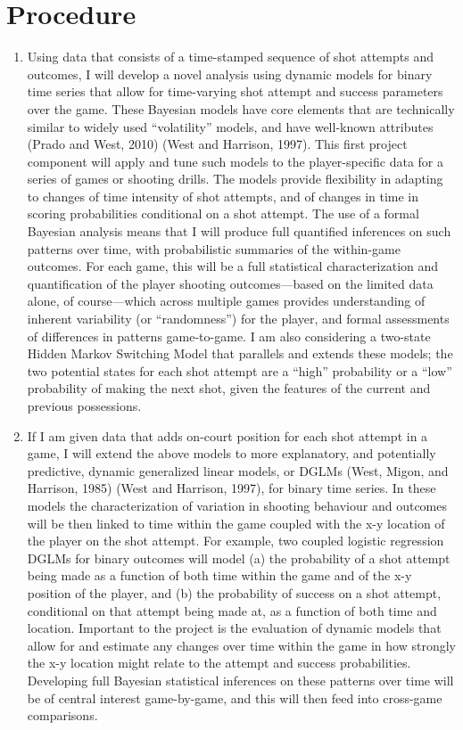 \documentclass[12pt,twoside]{dukestatscithesis}
\theoremstyle{definition}
\theoremstyle{definition}
\theoremstyle{definition}
\theoremstyle{remark}
\begin{document}
\chapter{Procedure}\label{proc}
\begin{enumerate}
\def\labelenumi{\arabic{enumi}.}
\item
  Using data that consists of a time-stamped sequence of shot attempts
  and outcomes, I will develop a novel analysis using dynamic models for
  binary time series that allow for time-varying shot attempt and
  success parameters over the game. These Bayesian models have core
  elements that are technically similar to widely used ``volatility''
  models, and have well-known attributes (Prado and West, 2010) (West
  and Harrison, 1997). This first project component will apply and tune
  such models to the player-specific data for a series of games or
  shooting drills. The models provide flexibility in adapting to changes
  of time intensity of shot attempts, and of changes in time in scoring
  probabilities conditional on a shot attempt. The use of a formal
  Bayesian analysis means that I will produce full quantified inferences
  on such patterns over time, with probabilistic summaries of the
  within-game outcomes. For each game, this will be a full statistical
  characterization and quantification of the player shooting
  outcomes---based on the limited data alone, of course---which across
  multiple games provides understanding of inherent variability (or
  ``randomness'') for the player, and formal assessments of differences
  in patterns game-to-game. I am also considering a two-state Hidden
  Markov Switching Model that parallels and extends these models; the
  two potential states for each shot attempt are a ``high'' probability
  or a ``low'' probability of making the next shot, given the features
  of the current and previous possessions.
\item
  If I am given data that adds on-court position for each shot attempt
  in a game, I will extend the above models to more explanatory, and
  potentially predictive, dynamic generalized linear models, or DGLMs
  (West, Migon, and Harrison, 1985) (West and Harrison, 1997), for
  binary time series. In these models the characterization of variation
  in shooting behaviour and outcomes will be then linked to time within
  the game coupled with the x-y location of the player on the shot
  attempt. For example, two coupled logistic regression DGLMs for binary
  outcomes will model (a) the probability of a shot attempt being made
  as a function of both time within the game and of the x-y position of
  the player, and (b) the probability of success on a shot attempt,
  conditional on that attempt being made at, as a function of both time
  and location. Important to the project is the evaluation of dynamic
  models that allow for and estimate any changes over time within the
  game in how strongly the x-y location might relate to the attempt and
  success probabilities. Developing full Bayesian statistical inferences
  on these patterns over time will be of central interest game-by-game,
  and this will then feed into cross-game comparisons.
\end{enumerate}
\backmatter
\end{document}
